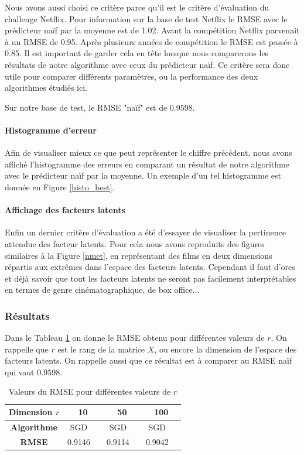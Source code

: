 \documentclass[10pt,a4paper]{article}
\begin{document}
Nous avons aussi choisi ce critère parce qu'il est le critère d'évaluation du challenge Netflix. Pour information sur la base de test Netflix le RMSE avec le prédicteur naïf par la moyenne est de 1.02. Avant la compétition Netflix parvenait à un RMSE de 0.95. Après plusieurs années de compétition le RMSE est passée à 0.85. Il est important de garder cela en tête lorsque nous comparerons les résultats de notre algorithme avec ceux du prédicteur naïf. Ce critère sera donc utile pour comparer différents paramètres, ou la performance des deux algorithmes étudiés ici. 

 Sur notre base de test, le RMSE "naïf" est de 0.9598.

\paragraph{Histogramme d'erreur} Afin de visualiser mieux ce que peut représenter le chiffre précédent, nous avons affiché l'histogramme des erreurs en comparant un résultat de notre algorithme avec le prédicteur naïf par la moyenne. Un exemple d'un tel histogramme est donnée en Figure \ref{histo_best}.

\paragraph{Affichage des facteurs latents}

Enfin un dernier critère d'évaluation a été d'essayer de visualiser la pertinence attendue des facteur latents. Pour cela nous avons reproduits des figures similaires à la Figure \ref{nmet}, en représentant des films en deux dimensions répartis aux extrêmes dans l'espace des facteurs latents. Cependant il faut d'ores et déjà savoir que tout les facteurs latents ne seront pas facilement interprétables en termes de genre cinématographique, de box office...

\subsubsection*{Résultats}

Dans le Tableau \ref{RMSE_vs_r} on donne le RMSE obtenu pour différentes valeurs de $r$. On rappelle que $r$ est le rang de la matrice $X$, ou encore la dimension de l'espace des facteurs latents. On rappelle aussi que ce résultat est à comparer au RMSE naïf qui vaut $0.9598$.

\begin{table}[h]
\begin{center}
   \begin{tabular}{|c|c|c|c|c|c|c|}
  	\hline
  	\textbf{Dimension $r$} & \multicolumn{2}{c|}{10} & \multicolumn{2}{c|}{50} & \multicolumn{2}{c|}{100} \\
  	\hline
  	\textbf{Algorithme} & SGD & \jel & SGD & \jel & SGD & \jel \\
  	\hline
  	\textbf{RMSE}  & 0.9146  &  & 0.9114 & & 0.9042 &\\
  	\hline
\end{tabular}
\end{center}
\caption{\label{RMSE_vs_r} Valeurs du RMSE pour différentes valeurs de $r$}
\end{table}
\end{document}
